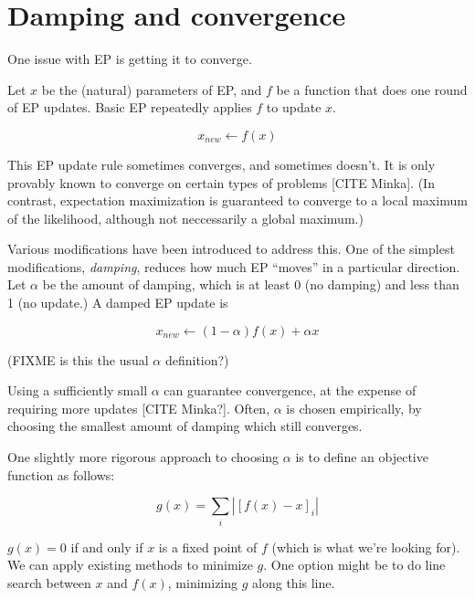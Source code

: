 \documentclass{article}\usepackage[]{graphicx}\usepackage[]{color}
\begin{document}
\section{Damping and convergence}

One issue with EP is getting it to converge.

Let $x$ be the (natural) parameters of EP, and $f$ be a function that
does one round of EP updates. Basic EP repeatedly applies $f$ to update $x$.

\[x_{new} \leftarrow f(x)\]

This EP update rule sometimes converges, and sometimes doesn't.
It is only provably known to converge on certain types of problems [CITE Minka].
(In contrast, expectation maximization is guaranteed to converge
to a local maximum of the likelihood, although not neccessarily a global maximum.)

Various modifications have been introduced to address this.
One of the simplest modifications, {\em damping}, reduces how much EP ``moves''
in a particular direction. Let $\alpha$ be the amount of damping, which is
at least 0 (no
damping) and less than 1 (no update.) A damped EP update is

\[x_{new} \leftarrow (1-\alpha)f(x) + \alpha x\]

(FIXME is this the usual $\alpha$ definition?)

Using a sufficiently small $\alpha$ can guarantee convergence, at the expense
of requiring more updates [CITE Minka?]. Often, $\alpha$ is chosen empirically,
by choosing the smallest amount of damping which still converges.

One slightly more rigorous approach to choosing
$\alpha$ is to define an objective function as follows:

\[g(x) = \sum_i |[f(x) - x]_i|\]

$g(x) = 0$ if and only if $x$ is a fixed point of $f$ (which is what we're looking for).
We can apply existing methods to minimize $g$. One option might be to do line search
between $x$ and $f(x)$, minimizing $g$ along this line.
\end{document}
